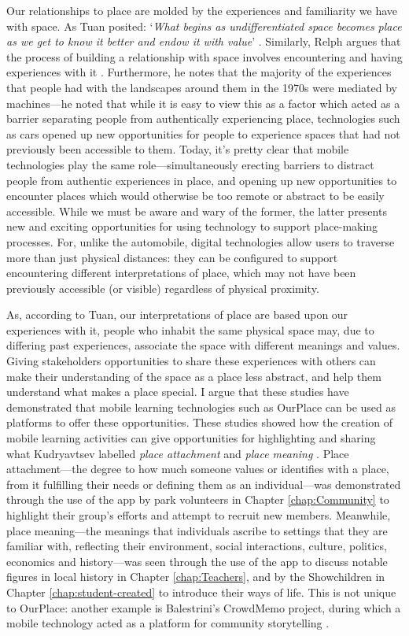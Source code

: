Our relationships to place are molded by the experiences and familiarity we have with space. As Tuan posited: `\textit{What begins as undifferentiated space becomes place as we get to know it better and endow it with value}' \citep{Tuan1978}. Similarly, Relph argues that the process of building a relationship with space involves encountering and having experiences with it \citep{Relph1976}. Furthermore, he notes that the majority of the experiences that people had with the landscapes around them in the 1970s were mediated by machines---he noted that while it is easy to view this as a factor which acted as a barrier separating people from authentically experiencing place, technologies such as cars opened up new opportunities for people to experience spaces that had not previously been accessible to them. Today, it's pretty clear that mobile technologies play the same role---simultaneously erecting barriers to distract people from authentic experiences in place, and opening up new opportunities to encounter places which would otherwise be too remote or abstract to be easily accessible. While we must be aware and wary of the former, the latter presents new and exciting opportunities for using technology to support place-making processes. For, unlike the automobile, digital technologies allow users to traverse more than just physical distances: they can be configured to support encountering different interpretations of place, which may not have been previously accessible (or visible) regardless of physical proximity.

As, according to Tuan, our interpretations of place are based upon our experiences with it, people who inhabit the same physical space may, due to differing past experiences, associate the space with different meanings and values. Giving stakeholders opportunities to share these experiences with others can make their understanding of the space as a place less abstract, and help them understand what makes a place special. I argue that these studies have demonstrated that mobile learning technologies such as OurPlace can be used as platforms to offer these opportunities.  These studies showed how the creation of mobile learning activities can give opportunities for highlighting and sharing what Kudryavtsev labelled \textit{place attachment} and \textit{place meaning} \citep{Kudryavtsev2012}. Place attachment---the degree to how much someone values or identifies with a place, from it fulfilling their needs or defining them as an individual---was demonstrated through the use of the app by park volunteers in Chapter \ref{chap:Community} to highlight their group's efforts and attempt to recruit new members. Meanwhile, place meaning---the meanings that individuals ascribe to settings that they are familiar with, reflecting their environment, social interactions, culture, politics, economics and history---was seen through the use of the app to discuss notable figures in local history in Chapter \ref{chap:Teachers}, and by the Showchildren in Chapter \ref{chap:student-created} to introduce their ways of life. This is not unique to OurPlace: another example is Balestrini's CrowdMemo project, during which a mobile technology acted as a platform for community storytelling \citep{Balestrini2014}.

